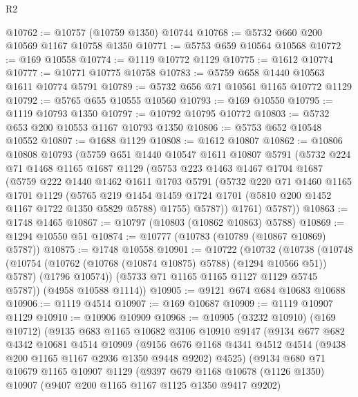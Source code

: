 \begin{lexlean}{R2}
\begin{coremodule}
@10762 := @10757 (@10759 @1350) @10744
@10768 := @5732 @660 @200 @10569 @1167 @10758 @1350
@10771 := @5753 @659 @10564 @10568
@10772 := @169 @10558
@10774 := @1119 @10772 @1129
@10775 := @1612 @10774
@10777 := @10771 @10775 @10758
@10783 := @5759 @658 @1440 @10563 @1611 @10774 @5791
@10789 := @5732 @656 @71 @10561 @1165 @10772 @1129
@10792 := @5765 @655 @10555 @10560
@10793 := @169 @10550
@10795 := @1119 @10793 @1350
@10797 := @10792 @10795 @10772
@10803 := @5732 @653 @200 @10553 @1167 @10793 @1350
@10806 := @5753 @652 @10548 @10552
@10807 := @1688 @1129
@10808 := @1612 @10807
@10862 := @10806
    @10808
    @10793
    (@5759
      @651
      @1440
      @10547
      @1611
      @10807
      @5791
      (@5732
        @224
        @71
        @1468
        @1165
        @1687
        @1129
        (@5753
          @223
          @1463
          @1467
          @1704
          @1687
          (@5759
            @222
            @1440
            @1462
            @1611
            @1703
            @5791
            (@5732
              @220
              @71
              @1460
              @1165
              @1701
              @1129
              (@5765
                @219
                @1454
                @1459
                @1724
                @1701
                (@5810 @200 @1452 @1167 @1722 @1350 @5829 @5788)
                @1755)
              @5787))
          @1761)
        @5787))
@10863 := @1748 @1465
@10867 := @10797 (@10803 (@10862 @10863) @5788)
@10869 := @1294 @10550 @51
@10874 := @10777 (@10783 (@10789 (@10867 @10869) @5787))
@10875 := @1748 @10558
@10901 := @10722
    (@10732
      (@10738
        (@10748
          (@10754 (@10762 (@10768 (@10874 @10875) @5788) (@1294 @10566 @51)) @5787)
          (@1796 @10574))
        (@5733 @71 @1165 @1165 @1127 @1129 @5745 @5787))
      (@4958 @10588 @1114))
@10905 := @9121 @674 @684 @10683 @10688
@10906 := @1119 @4514
@10907 := @169 @10687
@10909 := @1119 @10907 @1129
@10910 := @10906 @10909
@10968 := @10905
    (@3232 @10910)
    (@169 @10712)
    (@9135
      @683
      @1165
      @10682
      @3106
      @10910
      @9147
      (@9134
        @677
        @682
        @4342
        @10681
        @4514
        @10909
        (@9156 @676 @1168 @4341 @4512 @4514 (@9438 @200 @1165 @1167 @2936 @1350 @9448 @9202) @4525)
        (@9134
          @680
          @71
          @10679
          @1165
          @10907
          @1129
          (@9397
            @679
            @1168
            @10678
            (@1126 @1350)
            @10907
            (@9407 @200 @1165 @1167 @1125 @1350 @9417 @9202)

\end{coremodule}
\end{lexlean}
